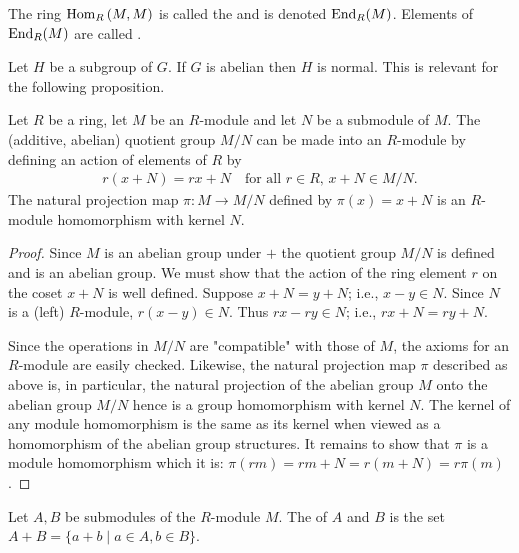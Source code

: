     \begin{definition}\label{def:endomorphism-ring}
        The ring $\operatorname{Hom}_R{(M,M)}$ is called the  and is denoted $\operatorname{End}_R(M)$. Elements of $\operatorname{End}_R(M)$ are called .
    \end{definition}

    \begin{note}
        Let $H$ be a subgroup of $G$. If $G$ is abelian then $H$ is normal. This is relevant for the following proposition.
    \end{note}

    \begin{proposition}
        Let $R$ be a ring, let $M$ be an $R$-module and let $N$ be a submodule of $M$. The (additive, abelian) quotient group $M/N$ can be made into an $R$-module by defining an action of elements of $R$ by
            \begin{equation*}
            \begin{split}
                r(x+N) = rx + N \quad \text{for all $r \in R$, $x + N \in M/N$}.
            \end{split}
            \end{equation*}
        The natural projection map $\pi:M \rightarrow M/N$ defined by $\pi(x) = x +N$ is an $R$-module homomorphism with kernel $N$.
    \end{proposition}
    \begin{proof}
        Since $M$ is an abelian group under $+$ the quotient group $M/N$ is defined and is an abelian group. We must show that the action of the ring element $r$ on the coset $x + N$ is well defined. Suppose $x + N = y+ N$; i.e., $x-y \in N$. Since $N$ is a (left) $R$-module, $r(x-y) \in N$. Thus $rx-ry \in N$; i.e., $rx + N = ry + N$.

        Since the operations in $M/N$ are "compatible" with those of $M$, the axioms for an $R$-module are easily checked. Likewise, the natural projection map $\pi$ described as above is, in particular, the natural projection of the abelian group $M$ onto the abelian group $M/N$ hence is a group homomorphism with kernel $N$. The kernel of any module homomorphism is the same as its kernel when viewed as a homomorphism of the abelian group structures. It remains to show that $\pi$ is a module homomorphism \textemdash which it is: $\pi(rm) = rm + N = r(m+N) = r\pi(m)$.
    \end{proof}

    \begin{definition}\label{def:module-sum}
        Let $A,B$ be submodules of the $R$-module $M$. The  of $A$ and $B$ is the set $A+B = \{a+b \mid a \in A, b\in B\}$.
    \end{definition}

